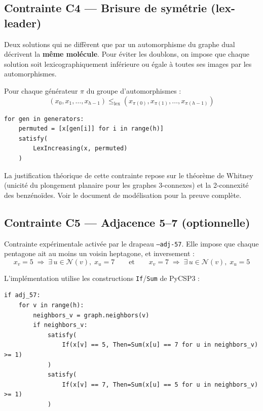 \documentclass[12pt,a4paper]{article}
\theoremstyle{definition}
\begin{document}
\subsection{Contrainte C4 — Brisure de symétrie (lex-leader)}

Deux solutions qui ne diffèrent que par un automorphisme du graphe dual décrivent la
\textbf{même molécule}. Pour éviter les doublons, on impose que chaque solution soit
lexicographiquement inférieure ou égale à toutes ses images par les automorphismes.

Pour chaque générateur $\pi$ du groupe d'automorphismes :
\[
  (x_0, x_1, \ldots, x_{h-1}) \leq_{\text{lex}} (x_{\pi(0)}, x_{\pi(1)}, \ldots, x_{\pi(h-1)})
\]

\begin{lstlisting}
for gen in generators:
    permuted = [x[gen[i]] for i in range(h)]
    satisfy(
        LexIncreasing(x, permuted)
    )
\end{lstlisting}

\begin{remarque}
  La justification théorique de cette contrainte repose sur le théorème de Whitney
  (unicité du plongement planaire pour les graphes 3-connexes) et la 2-connexité des
  benzénoïdes. Voir le document de modélisation pour la preuve complète.
\end{remarque}

\subsection{Contrainte C5 — Adjacence 5--7 (optionnelle)}

Contrainte expérimentale activée par le drapeau \texttt{--adj-57}. Elle impose que chaque
pentagone ait au moins un voisin heptagone, et inversement :
\[
  x_v = 5 \;\Longrightarrow\; \exists\, u \in \mathcal{N}(v),\; x_u = 7
  \qquad\text{et}\qquad
  x_v = 7 \;\Longrightarrow\; \exists\, u \in \mathcal{N}(v),\; x_u = 5
\]

L'implémentation utilise les constructions \texttt{If}/\texttt{Sum} de PyCSP3 :

\begin{lstlisting}
if adj_57:
    for v in range(h):
        neighbors_v = graph.neighbors(v)
        if neighbors_v:
            satisfy(
                If(x[v] == 5, Then=Sum(x[u] == 7 for u in neighbors_v) >= 1)
            )
            satisfy(
                If(x[v] == 7, Then=Sum(x[u] == 5 for u in neighbors_v) >= 1)
            )
\end{lstlisting}
\end{document}
